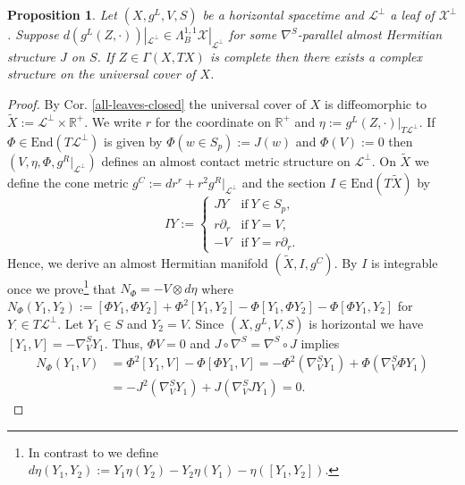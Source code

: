 \documentclass[a4paper,10pt,twoside]{amsart}
\newtheorem{proposition}[theorem]{Proposition}
\theoremstyle{definition}
\theoremstyle{remark}
\numberwithin{equation}{section}
\begin{document}
\begin{proposition}
	Let $(X,g^{L},V,S)$ be a horizontal spacetime and $\mathcal{L}^{\perp}$ a leaf of $\mathcal{X}^{\perp}$. Suppose
	$d(g^{L}(Z,\cdot))|_{\mathcal{L}^{\perp}} \in \Lambda^{1,1}_{B}\mathcal{X}|_{\mathcal{L}^{\perp}}$ for some $\nabla^{S}$-parallel almost
	Hermitian structure $J$ on $S$. If $Z \in \Gamma(X,TX)$ is complete then there exists a complex structure on the universal cover of $X$.
\end{proposition}
\begin{proof}
	By Cor. \ref{all-leaves-closed} the universal cover of $X$ is diffeomorphic to $\tilde{X}:=\mathcal{L}^{\perp} \times {\mathbb{R}}^{+}$. We write $r$
	for the coordinate on ${\mathbb{R}}^{+}$ and $\eta:=g^{L}(Z,\cdot)|_{T\mathcal{L}^{\perp}}$. If $\Phi \in \mbox{End}(T\mathcal{L}^{\perp})$ is given by
	$\Phi(w \in S_{p}):=J(w)$ and $\Phi(V):=0$ then $(V,\eta,\Phi,g^{R}|_{\mathcal{L}^{\perp}})$ defines an almost contact metric structure on
	$\mathcal{L}^{\perp}$. On $\tilde{X}$ we define the cone metric $g^{C}:=dr^{r} + r^{2}g^{R}|_{\mathcal{L}^{\perp}}$ and the section
	$I \in \mbox{End}(T\tilde{X})$ by
	\begin{equation*}
		IY := \begin{cases}
			JY &\text{if}~Y \in S_{p},\\
			r\partial_{r} &\text{if}~Y=V,\\
			-V &\text{if}~Y=r\partial_{r}.
		      \end{cases}
	\end{equation*}
	Hence, we derive an almost Hermitian manifold $(\tilde{X},I,g^{C})$. By \cite[Thm. 6.5.9]{MR2382957} $I$ is integrable once we
	prove\footnote{In contrast to \cite{MR2382957} we define $d\eta(Y_{1},Y_{2}):= Y_{1}\eta(Y_{2})-Y_{2}\eta(Y_{1})-\eta([Y_{1},Y_{2}])$.} that
	$N_{\Phi}=-V \otimes d\eta$ where
	$N_{\Phi}(Y_{1},Y_{2}):=[\Phi Y_{1},\Phi Y_{2}] +\Phi^{2}[Y_{1},Y_{2}] - \Phi[Y_{1},\Phi Y_{2}] -\Phi[\Phi Y_{1},Y_{2}]$ for
	$Y_{\cdot} \in T\mathcal{L}^{\perp}$. Let $Y_{1} \in S$ and $Y_{2}=V$. Since $(X,g^{L},V,S)$ is horizontal we have
	$[Y_{1},V]=-\nabla^{S}_{V}{Y_{1}}$. Thus, $\Phi V =0$ and $J \circ \nabla^{S} = \nabla^{S}\circ J$ implies
	\begin{align*}
		N_{\Phi}(Y_{1},V) &= \Phi^{2}[Y_{1},V] - \Phi[\Phi Y_{1},V] = -\Phi^{2}(\nabla^{S}_{V}{Y_{1}}) + \Phi(\nabla^{S}_{V}{\Phi Y_{1}})\\
				&=-J^{2}(\nabla^{S}_{V}{Y_{1}}) + J(\nabla^{S}_{V}{JY_{1}}) =0.
	\end{align*}

\end{proof}
\end{document}
